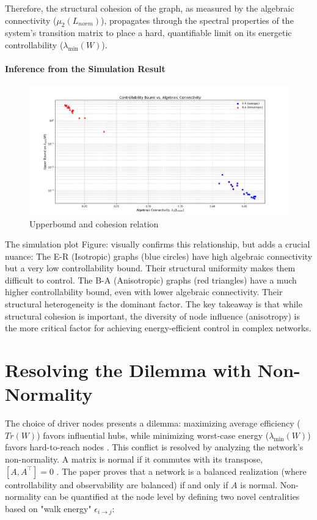 \documentclass[11pt, a4paper]{article}
\begin{document}
\vspace{1em}
\noindent Therefore, the structural cohesion of the graph, as measured by the algebraic connectivity ($\mu_2(L_{norm})$), propagates through the spectral properties of the system's transition matrix to place a hard, quantifiable limit on its energetic controllability ($\lambda_{\min}(W)$).
\paragraph{Inference from the Simulation Result}
\begin{figure}[h]
    \centering
    \includegraphics[width=0.5\linewidth]{sim.png}
    \caption{Upperbound and cohesion relation}
    \label{fig:sim_result}
\end{figure}
The simulation plot Figure:  visually confirms  this relationship, but adds a crucial nuance:
The E-R (Isotropic) graphs (blue circles) have high algebraic connectivity but a very low controllability bound. Their structural uniformity makes them difficult to control. The B-A (Anisotropic) graphs (red triangles) have a much higher controllability bound, even with lower algebraic connectivity. Their structural heterogeneity is the dominant factor.
The key takeaway is that while structural cohesion is important, the diversity of node influence (anisotropy) is the more critical factor for achieving energy-efficient control in complex networks.
\section{Resolving the Dilemma with Non-Normality}
The choice of driver nodes presents a dilemma: maximizing average efficiency ($Tr(W)$) favors influential hubs, while minimizing worst-case energy ($\lambda_{\min}(W)$) favors hard-to-reach nodes . This conflict is resolved by analyzing the network's non-normality.
A matrix is normal if it commutes with its transpose, $[A, A^\top] = 0$ . The paper proves that a network is a balanced realization (where controllability and observability are balanced) if and only if $A$ is normal. Non-normality can be quantified at the node level by defining two novel centralities based on "walk energy" $\epsilon_{i \to j}$:
\end{document}
